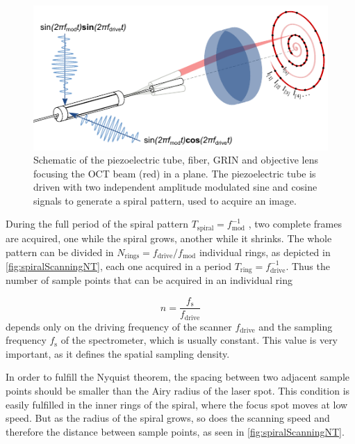 \documentclass[10pt]{iopart}
\begin{document}
\begin{figure}[h!]\centering \includegraphics[width=\columnwidth]{figures/PZTDrivingMoving.pdf}
      \caption{Schematic of the piezoelectric tube, fiber, GRIN and objective lens focusing the OCT beam (red) in a plane. 
      The piezoelectric tube is driven with two independent amplitude modulated sine and cosine signals to generate a spiral pattern, used to acquire an image. }
      \label{fig:PZTDriving}
\end{figure}


During the full period of the spiral pattern $T_\mathrm{spiral}=f_\mathrm{mod}^{-1}$ , two complete frames are acquired, one while the spiral grows, another while it shrinks. The whole pattern can be divided in $N_\mathrm{rings} = f_\mathrm{drive}/f_\mathrm{mod}$ individual rings, as depicted in \autoref{fig:spiralScanningNT}, each one acquired in a period $T_\mathrm{ring}=f_\mathrm{drive}^{-1}$. Thus the number of sample points that can be acquired in an individual ring

\begin{equation}
n = \frac{f_\mathrm{s}}{f_\mathrm{drive}}
\label{eq:nT}
\end{equation}
depends only on the driving frequency of the scanner $f_\mathrm{drive}$ and the sampling frequency $f_\mathrm{s}$ of the spectrometer, which is usually constant. This value is very important, as it defines the spatial sampling density. 

In order to fulfill the Nyquist theorem, the spacing between two adjacent sample points should be smaller than the Airy radius of the laser spot. This condition is easily fulfilled in the inner rings of the spiral, where the focus spot moves at low speed. But as the radius of the spiral grows, so does the scanning speed and therefore the distance between sample points, as seen in \autoref{fig:spiralScanningNT}.
\end{document}
